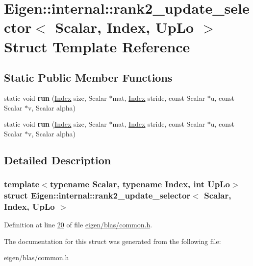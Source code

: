 \hypertarget{struct_eigen_1_1internal_1_1rank2__update__selector}{}\section{Eigen\+:\+:internal\+:\+:rank2\+\_\+update\+\_\+selector$<$ Scalar, Index, Up\+Lo $>$ Struct Template Reference}
\label{struct_eigen_1_1internal_1_1rank2__update__selector}
\subsection*{Static Public Member Functions}
\begin{DoxyCompactItemize}
\item 
\mbox{\label{struct_eigen_1_1internal_1_1rank2__update__selector_ad7e104aef4fec0b439648e399257f9b5}} 
static void {\bfseries run} (\hyperlink{namespace_eigen_a62e77e0933482dafde8fe197d9a2cfde}{Index} size, Scalar $\ast$mat, \hyperlink{namespace_eigen_a62e77e0933482dafde8fe197d9a2cfde}{Index} stride, const Scalar $\ast$u, const Scalar $\ast$v, Scalar alpha)
\item 
\mbox{\label{struct_eigen_1_1internal_1_1rank2__update__selector_ad7e104aef4fec0b439648e399257f9b5}} 
static void {\bfseries run} (\hyperlink{namespace_eigen_a62e77e0933482dafde8fe197d9a2cfde}{Index} size, Scalar $\ast$mat, \hyperlink{namespace_eigen_a62e77e0933482dafde8fe197d9a2cfde}{Index} stride, const Scalar $\ast$u, const Scalar $\ast$v, Scalar alpha)
\end{DoxyCompactItemize}


\subsection{Detailed Description}
\subsubsection*{template$<$typename Scalar, typename Index, int Up\+Lo$>$\newline
struct Eigen\+::internal\+::rank2\+\_\+update\+\_\+selector$<$ Scalar, Index, Up\+Lo $>$}



Definition at line \hyperlink{eigen_2blas_2common_8h_source_l00020}{20} of file \hyperlink{eigen_2blas_2common_8h_source}{eigen/blas/common.\+h}.



The documentation for this struct was generated from the following file\+:\begin{DoxyCompactItemize}
\item 
eigen/blas/common.\+h\end{DoxyCompactItemize}
